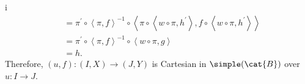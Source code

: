 \begin{partsolution}{i}
\begin{align*}
&= \pi^\prime \circ \left\langle \pi, f\right\rangle^{-1} \circ \left\langle \pi \circ \left\langle w \circ \pi, h^\prime\right\rangle, f \circ \left\langle w \circ \pi, h^\prime\right\rangle\right\rangle \\
&= \pi^\prime \circ \left\langle \pi, f\right\rangle^{-1} \circ \left\langle  w \circ \pi, g\right\rangle \\
&= h.
\end{align*}
Therefore, \((u, f) : (I, X) \to (J, Y)\) is Cartesian in \(\simple(\cat{B})\) over \(u : I \to J\).
\end{partsolution}
